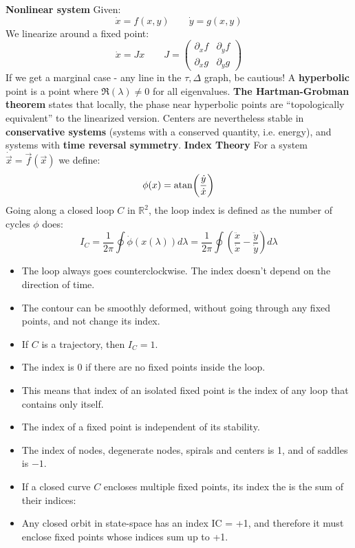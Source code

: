 \documentclass[twocolumn]{article}
\newcommand{\R}{\ensuremath{\mathbb{R}}}
\begin{document}
\textbf{Nonlinear system}
Given:
\begin{equation}
    \dot{x} = f(x, y) \qquad
    \dot{y} = g(x, y)
\end{equation}
We linearize around a fixed point:
\begin{equation}
    \dot{x} = Jx
    \qquad
    J = \begin{pmatrix}
        \partial_x f & \partial_y f \\ \partial_x g & \partial_y g
    \end{pmatrix}
\end{equation}
If we get a marginal case - any line in the $\tau, \Delta$ graph, be cautious!
\newline
A \textbf{hyperbolic} point is a point where $\Re(\lambda) \ne 0$ for all eigenvalues. \textbf{The Hartman-Grobman theorem} states that locally, the phase near hyperbolic points are “topologically equivalent” to the linearized version.
\newline
Centers are nevertheless stable in \textbf{conservative systems} (systems with a conserved quantity, i.e. energy), and systems with \textbf{time reversal symmetry}.
\newline
\textbf{Index Theory}
\newline
For a system $\dot{\vec{x}} = \vec{f}(\vec{x})$ we define:
\begin{equation}
    \phi(x) = \atan(\frac{\dot{y}}{\dot{x}})
\end{equation}
Going along a closed loop $C$ in $\R^2$, the loop index is defined as the number of cycles $\phi$ does:
\begin{equation}
    I_C = \frac{1}{2\pi} \oint \dot{\phi}(x(\lambda))d\lambda = 
    \frac{1}{2\pi} \oint \left(\frac{\ddot{x}}{\dot{x}} - \frac{\ddot{y}}{\dot{y}}\right)d\lambda
\end{equation}
\begin{itemize}
    \item The loop always goes counterclockwise. The index doesn't depend on the direction of time.
    \item The contour can be smoothly deformed, without going through any fixed points, and not change its index.
    \item If $C$ is a trajectory, then $I_C = 1$.
    \item The index is $0$ if there are no fixed points inside the loop.
    \item This means that index of an isolated fixed point is the index of any loop that contains only itself.
    \item The index of a fixed point is independent of its stability.
    \item The index of nodes, degenerate nodes, spirals and centers is 1, and of saddles is $-1$.
    \item If a closed curve $C$ encloses multiple fixed points, its index the is the sum of their indices:
    \item Any closed orbit in state-space has an index IC = +1, and therefore it must enclose fixed points whose indices sum up to +1.
\end{itemize}
\end{document}
